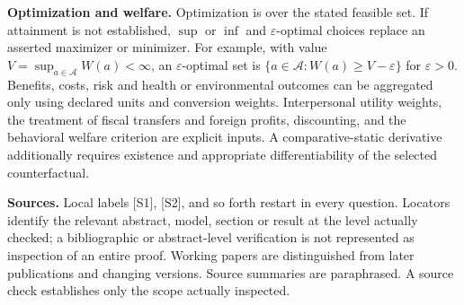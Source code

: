 \documentclass[11pt,a4paper]{article}
\begin{document}
\textbf{Optimization and welfare.} Optimization is over the stated feasible set. If attainment is not established, $\sup$ or $\inf$ and $\varepsilon$-optimal choices replace an asserted maximizer or minimizer. For example, with value $V=\sup_{a\in\mathcal A}W(a)<\infty$, an $\varepsilon$-optimal set is $\{a\in\mathcal A:W(a)\geq V-\varepsilon\}$ for $\varepsilon>0$. Benefits, costs, risk and health or environmental outcomes can be aggregated only using declared units and conversion weights. Interpersonal utility weights, the treatment of fiscal transfers and foreign profits, discounting, and the behavioral welfare criterion are explicit inputs. A comparative-static derivative additionally requires existence and appropriate differentiability of the selected counterfactual.

\textbf{Sources.} Local labels [S1], [S2], and so forth restart in every question. Locators identify the relevant abstract, model, section or result at the level actually checked; a bibliographic or abstract-level verification is not represented as inspection of an entire proof. Working papers are distinguished from later publications and changing versions. Source summaries are paraphrased. A source check establishes only the scope actually inspected.
\end{document}
